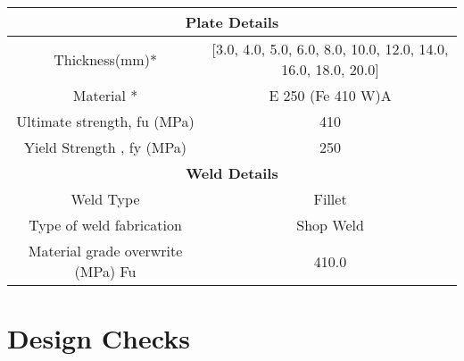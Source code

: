 \documentclass{article}%
\begin{document}
\begin{longtable}{|p{5cm}|p{2cm}|p{2cm}|p{2cm}|p{5cm}|}
\hline%
\hline%
\multicolumn{5}{|c|}{\textbf{Plate Details}}\\%
\hline%
\hline%
\multicolumn{3}{|c|}{Thickness(mm)*}&\multicolumn{2}{|c|}{{[}3.0, 4.0, 5.0, 6.0, 8.0, 10.0, 12.0, 14.0, 16.0, 18.0, 20.0{]}}\\%
\hline%
\hline%
\multicolumn{3}{|c|}{Material *}&\multicolumn{2}{|c|}{E 250 (Fe 410 W)A}\\%
\hline%
\hline%
\multicolumn{3}{|c|}{Ultimate strength, fu (MPa)}&\multicolumn{2}{|c|}{410}\\%
\hline%
\hline%
\multicolumn{3}{|c|}{Yield Strength , fy (MPa)}&\multicolumn{2}{|c|}{250}\\%
\hline%
\hline%
\multicolumn{5}{|c|}{\textbf{Weld Details}}\\%
\hline%
\hline%
\multicolumn{3}{|c|}{Weld Type}&\multicolumn{2}{|c|}{Fillet}\\%
\hline%
\hline%
\multicolumn{3}{|c|}{Type of weld fabrication}&\multicolumn{2}{|c|}{Shop Weld}\\%
\hline%
\hline%
\multicolumn{3}{|c|}{Material grade overwrite (MPa) Fu}&\multicolumn{2}{|c|}{410.0}\\%
\hline%
\end{longtable}

%
%
\newpage%
\section{Design Checks}%
\label{sec:DesignChecks}%
\end{document}

